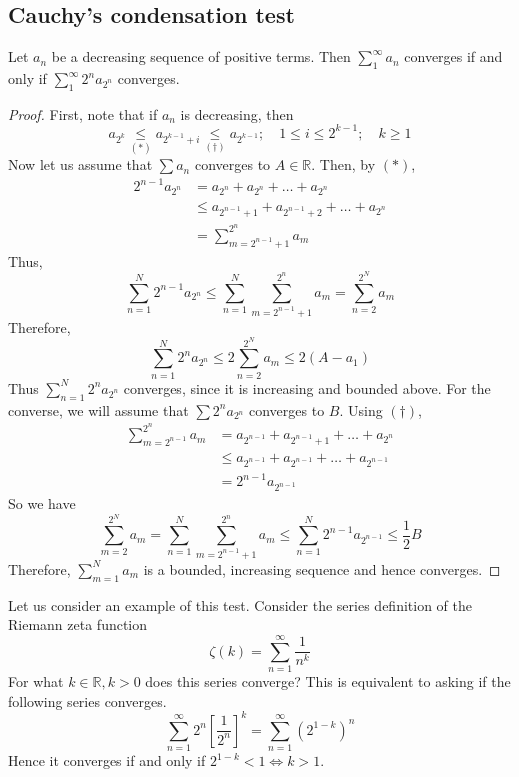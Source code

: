 \subsection{Cauchy's condensation test}
\begin{theorem}
	Let \(a_n\) be a decreasing sequence of positive terms.
	Then \(\sum_1^\infty a_n\) converges if and only if \(\sum_1^\infty 2^n a_{2^n}\) converges.
\end{theorem}
\begin{proof}
	First, note that if \(a_n\) is decreasing, then
	\[
		a_{2^k} \underset{(\ast)}{\leq} a_{2^{k-1} + i} \underset{(\dagger)}{\leq} a_{2^{k-1}};\quad 1 \leq i \leq 2^{k-1};\quad k \geq 1
	\]
	Now let us assume that \(\sum a_n\) converges to \(A \in \mathbb R\).
	Then, by \((\ast)\),
	\begin{align*}
		2^{n-1} a_{2^n} & = a_{2^n} + a_{2^n} + \dots + a_{2^n}                \\
		                & \leq a_{2^{n-1}+1} + a_{2^{n-1}+2} + \dots + a_{2^n} \\
		                & = \sum_{m=2^{n-1}+1}^{2^n}a_m
	\end{align*}
	Thus,
	\[
		\sum_{n=1}^N 2^{n-1}a_{2^n} \leq \sum_{n=1}^N \sum_{m=2^{n-1}+1}^{2^n} a_m = \sum_{n=2}^{2^N} a_m
	\]
	Therefore,
	\[
		\sum_{n=1}^N 2^n a_{2^n} \leq 2 \sum_{n=2}^{2^N} a_m \leq 2(A-a_1)
	\]
	Thus \(\sum_{n=1}^N 2^n a_{2^n}\) converges, since it is increasing and bounded above.
	For the converse, we will assume that \(\sum 2^n a_{2^n}\) converges to \(B\).
	Using \((\dagger)\),
	\begin{align*}
		\sum_{m=2^{n-1}}^{2^n} a_m & = a_{2^{n-1}} + a_{2^{n-1}+1} + \dots + a_{2^n}      \\
		                           & \leq a_{2^{n-1}} + a_{2^{n-1}} + \dots + a_{2^{n-1}} \\
		                           & = 2^{n-1}a_{2^{n-1}}
	\end{align*}
	So we have
	\[
		\sum_{m=2}^{2^N} a_m = \sum_{n=1}^N \sum_{m=2^{n-1}+1}^{2^n} a_m \leq \sum_{n=1}^N 2^{n-1} a_{2^{n-1}} \leq \frac{1}{2} B
	\]
	Therefore, \(\sum_{m=1}^N a_m\) is a bounded, increasing sequence and hence converges.
\end{proof}
Let us consider an example of this test.
Consider the series definition of the Riemann zeta function
\[
	\zeta(k) = \sum_{n=1}^\infty \frac{1}{n^k}
\]
For what \(k \in \mathbb R, k>0\) does this series converge?
This is equivalent to asking if the following series converges.
\[
	\sum_{n=1}^\infty 2^n \left[ \frac{1}{2^n} \right]^k = \sum_{n=1}^\infty \left( 2^{1-k} \right)^n
\]
Hence it converges if and only if \(2^{1-k} < 1 \iff k > 1\).


